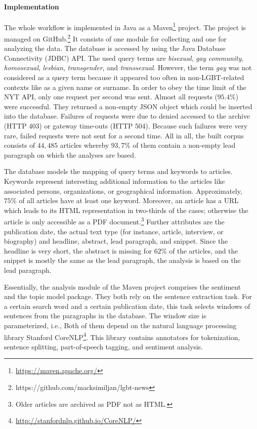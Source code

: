 \documentclass[10pt,a4paper,twocolumn]{scrartcl}
\begin{document}
\paragraph*{Implementation} The whole workflow is implemented in Java as a Maven\footnote{\url{https://maven.apache.org/}} project. The project is managed on GitHub.\footnote{https://github.com/macksimiljan/lgbt-news} It consists of one module for collecting and one for analyzing the data. The database is accessed by using the Java Database Connectivity (JDBC) API. The used query terms are \textit{bisexual}, \textit{gay community}, \textit{homosexual}, \textit{lesbian}, \textit{transgender}, and \textit{transsexual}. However, the term \textit{gay} was not considered as a query term because it appeared too often in non-LGBT-related contexts like as a given name or surname. In order to obey the time limit of the NYT API, only one request per second was sent. Almost all requests ($95.4\%$) were successful. They returned a non-empty JSON object which could be inserted into the database. Failures of requests were due to denied accessed to the archive (HTTP 403) or gateway time-outs (HTTP 504). Because such failures were very rare, failed requests were not sent for a second time. All in all, the built corpus consists of $44,485$ articles whereby $93,7\%$ of them contain a non-empty lead paragraph on which the analyses are based.

The database models the mapping of query terms and keywords to articles. Keywords represent interesting additional information to the articles like associated persons, organizations, or geographical information. Approximately, $75\%$ of all articles have at least one keyword. Moreover, an article has a URL which leads to its HTML representation in two-thirds of the cases; otherwise the article is only accessible as a PDF document.\footnote{Older articles are archived as PDF not as HTML.} Further attributes are the publication date, the actual text type (for instance, article, interview, or biography) and headline, abstract, lead paragraph, and snippet. Since the headline is very short, the abstract is missing for $62\%$ of the articles, and the snippet is mostly the same as the lead paragraph, the analysis is based on the lead paragraph.

Essentially, the analysis module of the Maven project comprises the sentiment and the topic model package. They both rely on the sentence extraction task. For a certain search word and a certain publication date, this task selects windows of sentences from the paragraphs in the database. The window size is parameterized, i.e.,  Both of them depend on the natural language processing library Stanford CoreNLP\footnote{\url{http://stanfordnlp.github.io/CoreNLP/}}. This library contains annotators for tokenization, sentence splitting, part-of-speech tagging, and sentiment analysis. 
\end{document}
